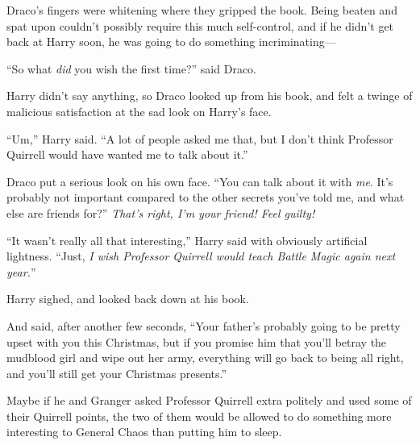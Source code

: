 Draco’s fingers were whitening where they gripped the book. Being beaten and
spat upon couldn’t possibly require this much self-control, and if he didn’t
get back at Harry soon, he was going to do something incriminating—

“So what \emph{did} you wish the first time?” said Draco.

Harry didn’t say anything, so Draco looked up from his book, and felt a twinge
of malicious satisfaction at the sad look on Harry’s face.

“Um,” Harry said. “A lot of people asked me that, but I don’t think Professor
Quirrell would have wanted me to talk about it.”

Draco put a serious look on his own face. “You can talk about it with
\emph{me}. It’s probably not important compared to the other secrets you’ve
told me, and what else are friends for?” \emph{That’s right, I’m your friend!
Feel guilty!}

“It wasn’t really all that interesting,” Harry said with obviously artificial
lightness. “Just, \emph{I wish Professor Quirrell would teach Battle Magic
again next year.}”

Harry sighed, and looked back down at his book.

And said, after another few seconds, “Your father’s probably going to be pretty
upset with you this Christmas, but if you promise him that you’ll betray the
mudblood girl and wipe out her army, everything will go back to being all
right, and you’ll still get your Christmas presents.”

Maybe if he and Granger asked Professor Quirrell extra politely and used some
of their Quirrell points, the two of them would be allowed to do something more
interesting to General Chaos than putting him to sleep.
